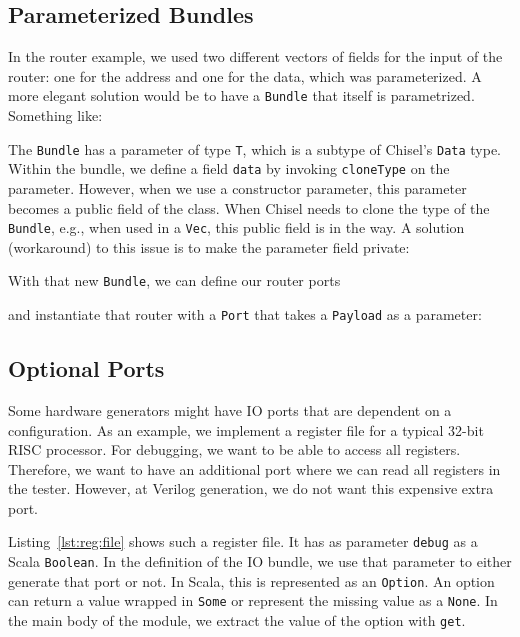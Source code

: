 \documentclass[%
    10pt,
    headinclude, footexclude,
    openright, %
    notitlepage,
    cleardoubleempty,
    headsepline,
    pointlessnumbers,
    bibtotoc, idxtotoc,
    ]{scrbook}
\newcommand{\code}[1]{{\lstinline[basicstyle=\small\ttfamily]{#1}}}
\begin{document}

\subsection{Parameterized Bundles}

In the router example, we used two different vectors of fields for the input
of the router: one for the address and one for the data, which was parameterized.
A more elegant solution would be to have a \code{Bundle} that itself
is parametrized. Something like:


The \code{Bundle} has a parameter of type \code{T}, which is a subtype
of Chisel's \code{Data} type.
Within the bundle, we define a field \code{data} by invoking \code{cloneType}
on the parameter.
However, when we use a constructor parameter, this parameter becomes a
public field of the class. When Chisel needs to clone the type of the \code{Bundle},
e.g., when used in a \code{Vec}, this public field is in the way.
A solution (workaround) to this issue is to make the parameter field private:


\noindent With that new \code{Bundle}, we can define our router ports


\noindent and instantiate that router with a \code{Port} that takes
a \code{Payload} as a parameter:


\subsection{Optional Ports}

Some hardware generators might have IO ports that are dependent on a configuration.
As an example, we implement a register file for a typical 32-bit RISC processor. For debugging,
we want to be able to access all registers. Therefore, we want to have an additional
port where we can read all registers in the tester. However, at Verilog generation,
we do not want this expensive extra port.

Listing~\ref{lst:reg:file} shows such a register file. It has as parameter \code{debug}
as a Scala \code{Boolean}. In the definition of the IO bundle, we use that parameter
to either generate that port or not. In Scala, this is represented as an \code{Option}.
An option can return a value wrapped in \code{Some} or represent the missing value
as a \code{None}. In the main body of the module, we extract the value of the option
with \code{get}.
\end{document}
